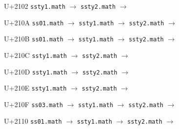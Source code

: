 \documentclass{article}
\begin{document}
\begin{substitutions}

U+2102  \linebreak
    \texttt{ssty1.math} $\to$  \linebreak
    \texttt{ssty2.math} $\to$  

\goodbreak

U+210A  \linebreak
    \texttt{ss01.math} $\to$  \linebreak
    \texttt{ssty1.math} $\to$  \linebreak
    \texttt{ssty2.math} $\to$  

\goodbreak

U+210B  \linebreak
    \texttt{ss01.math} $\to$  \linebreak
    \texttt{ssty1.math} $\to$  \linebreak
    \texttt{ssty2.math} $\to$  

\goodbreak

U+210C  \linebreak
    \texttt{ssty1.math} $\to$  \linebreak
    \texttt{ssty2.math} $\to$  

\goodbreak

U+210D  \linebreak
    \texttt{ssty1.math} $\to$  \linebreak
    \texttt{ssty2.math} $\to$  

\goodbreak

U+210E  \linebreak
    \texttt{ssty1.math} $\to$  \linebreak
    \texttt{ssty2.math} $\to$  

\goodbreak

U+210F  \linebreak
    \texttt{ss03.math} $\to$  \linebreak
    \texttt{ssty1.math} $\to$  \linebreak
    \texttt{ssty2.math} $\to$  

\goodbreak

U+2110  \linebreak
    \texttt{ss01.math} $\to$  \linebreak
    \texttt{ssty1.math} $\to$  \linebreak
    \texttt{ssty2.math} $\to$  


\end{substitutions}
\end{document}
